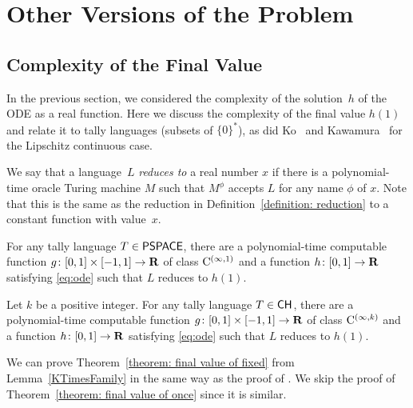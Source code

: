 \section{Other Versions of the Problem}

\subsection{Complexity of the Final Value}
\label{section: final value}
In the previous section, 
we considered the complexity of the solution~$h$ of the ODE as a real function. 
Here we discuss the complexity of the final value $h (1)$ and
relate it to tally languages (subsets of $\{0\}^*$), 
as did 
Ko~\cite{ko1983computational} and 
Kawamura~\cite[Theorem~5.1]{kawamura2010complexity}
for the Lipschitz continuous case.

We say that a language~$L$ \emph{reduces to} a real number $x$ 
if there is a polynomial-time oracle Turing machine $M$ 
such that $M^\phi$ accepts $L$ for any name $\phi$ of $x$.
Note that this is the same as 
the reduction in Definition~\ref{definition: reduction}
to a constant function with value~$x$. 


\begin{theorem}
\label{theorem: final value of once}
For any tally language $T \in \mathsf{PSPACE}$,
there are a polynomial-time computable function
$g \colon [0,1] \times [-1,1] \to \mathbf R$ 
of class $\mathrm C ^{(\infty, 1)}$ and 
a function $h \colon [0,1] \to \mathbf R$
satisfying \eqref{eq:ode} 
such that $L$ reduces to $h(1)$.
\end{theorem}

\begin{theorem}
\label{theorem: final value of fixed}
Let $k$ be a positive integer. 
For any tally language $T \in \mathsf{CH}$,
there are a polynomial-time computable function
$g \colon [0,1] \times [-1,1] \to \mathbf R$ 
of class $\mathrm C ^{(\infty, k)}$ and 
a function $h \colon [0,1] \to \mathbf R$
satisfying \eqref{eq:ode} 
such that $L$ reduces to $h(1)$.
\end{theorem}

We can prove Theorem~\ref{theorem: final value of fixed} 
from Lemma~\ref{KTimesFamily}
in the same way as the proof of \cite[Theorem~5.1]{kawamura2010complexity}.
We skip the proof of Theorem~\ref{theorem: final value of once}
since it is similar.

